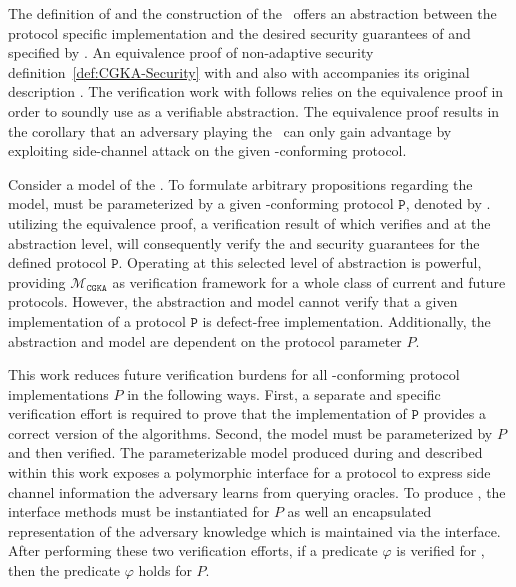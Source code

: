 The definition of  and the construction of the \CGKAsec\ offers an abstraction between the protocol specific implementation and the desired security guarantees of  and  specified by .
An equivalence proof of non-adaptive  security definition\ \ref{def:CGKA-Security} with  and also with  accompanies its original description \autocite{alwen2020security}.
The verification work with follows relies on the equivalence proof in order to soundly use  as a verifiable abstraction.
The equivalence proof results in the corollary that an adversary playing the \CGKAsec\ can only gain advantage by exploiting side-channel attack on the given -conforming protocol.

Consider a model \CGKAmod{}{}{} of the \CGKAsec.
To formulate arbitrary propositions regarding the model, \CGKAmod{}{}{} must be parameterized by a given -conforming protocol \(\mathtt{P}\), denoted by .
utilizing the equivalence proof, a verification result of  which verifies  and  at the abstraction level, will consequently verify the  and  security guarantees for the defined protocol \(\mathtt{P}\).
Operating at this selected level of abstraction is powerful, providing \(\mathcal{M}_{\texttt{CGKA}}\) as verification framework for a whole class of current and future protocols.
However, the  abstraction and model  cannot verify that a given implementation of a protocol \(\mathtt{P}\) is defect-free implementation.
Additionally, the  abstraction and model  are dependent on the protocol parameter \(P\).

This work reduces future verification burdens for all -conforming protocol implementations \(P\) in the following ways.
First, a separate and specific verification effort is required to prove that the implementation of \(\mathtt{P}\) provides a correct version of the  algorithms.
Second, the model \CGKAmod{}{}{} must be parameterized by \(P\) and then verified.
The parameterizable model \CGKAmod{}{}{} produced during and described within this work exposes a polymorphic interface for a protocol to express side channel information the adversary learns from querying oracles.
To produce , the interface methods must be instantiated for \(P\) as well an encapsulated representation of the adversary knowledge which is maintained via the interface.
After performing these two verification efforts, if a predicate \(\varphi\) is verified for , then the predicate \(\varphi\) holds for \(P\).

